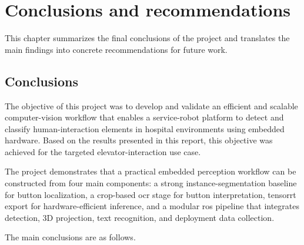 \chapter{Conclusions and recommendations}
\label{ch:conclusions}

This chapter summarizes the final conclusions of the project and translates the
main findings into concrete recommendations for future work.

\section{Conclusions}

The objective of this project was to develop and validate an efficient and
scalable computer-vision workflow that enables a service-robot platform to detect
and classify human-interaction elements in hospital environments using embedded
hardware. Based on the results presented in this report, this objective was
achieved for the targeted elevator-interaction use case.

The project demonstrates that a practical embedded perception workflow can be
constructed from four main components: a strong instance-segmentation baseline
for button localization, a crop-based \gls{ocr} stage for button interpretation,
\gls{tensorrt} export for hardware-efficient inference, and a modular \gls{ros}
pipeline that integrates detection, 3D projection, text recognition, and
deployment data collection.

The main conclusions are as follows.

